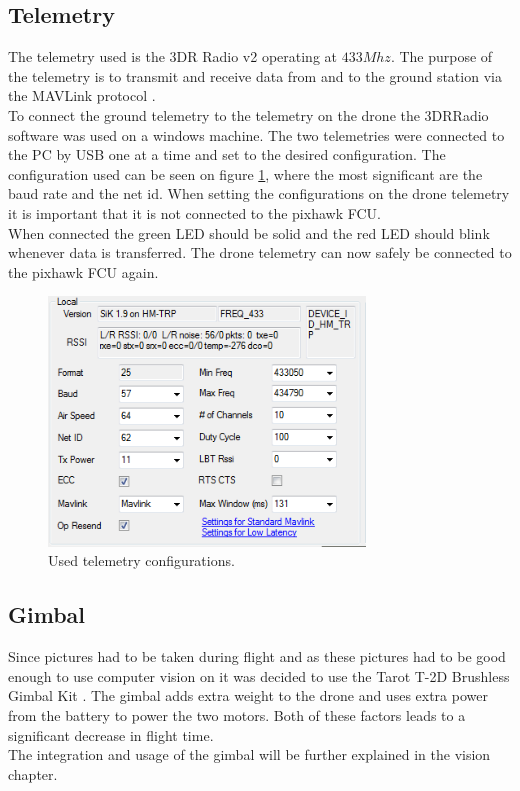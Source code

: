 \subsection*{Telemetry}
The telemetry used is the 3DR Radio v2 \cite{Ref:Telem} operating at $433 Mhz$. The purpose of the
telemetry is to transmit and receive data from and to the ground station via the MAVLink protocol
\cite{Ref:MAVLink}.\\
To connect the ground telemetry to the telemetry on the drone the 3DRRadio software was used on a
windows machine. The two telemetries were connected to the PC by USB one at a time and set to the
desired configuration. The configuration used can be seen on figure \ref{fig:telem}, where the most
significant are the baud rate and the net id. When setting the configurations on the drone telemetry
it is important that it is not connected to the pixhawk FCU.\\
When connected the green LED should be solid and the red LED should blink whenever data is
transferred. The drone telemetry can now safely be connected to the pixhawk FCU again.

\begin{figure}[H]
  \centering
    \includegraphics[width=0.75\textwidth]{./Images/telem}
  \caption{Used telemetry configurations.}
  \label{fig:telem}
\end{figure}

\subsection*{Gimbal}
Since pictures had to be taken during flight and as these pictures had to be good enough to use
computer vision on it was decided to use the Tarot T-2D Brushless Gimbal Kit \cite{Ref:Gimbal}. The
gimbal adds extra weight to the drone and uses extra power from the battery to power the two motors.
Both of these factors leads to a significant decrease in flight time.\\
The integration and usage of the gimbal will be further explained in the vision chapter. 
